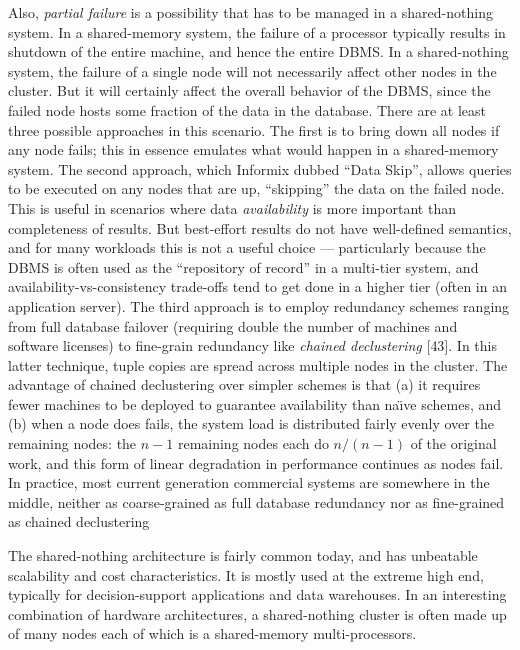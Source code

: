 \documentclass[a4paper,11pt,twoside,openright]{book}
\begin{document}
Also, \emph{partial failure} is a possibility that has to be managed in
a shared-nothing system. In a shared-memory system, the failure of a
processor typically results in shutdown of the entire machine, and hence
the entire DBMS. In a shared-nothing system, the failure of a single
node will not necessarily affect other nodes in the cluster. But it will
certainly affect the overall behavior of the DBMS, since the failed node
hosts some fraction of the data in the database. There are at least
three possible approaches in this scenario. The first is to bring down
all nodes if any node fails; this in essence emulates what would happen
in a shared-memory system. The second approach, which Informix dubbed
``Data Skip'', allows queries to be executed on any nodes that are up,
``skipping'' the data on the failed node. This is useful in scenarios
where data \emph{availability} is more important than completeness of
results. But best-effort results do not have well-defined semantics, and
for many workloads this is not a useful choice --- particularly because
the DBMS is often used as the ``repository of record'' in a multi-tier
system, and availability-vs-consistency trade-offs tend to get done in a
higher tier (often in an application server). The third approach is to
employ redundancy schemes ranging from full database failover (requiring
double the number of machines and software licenses) to fine-grain
redundancy like \emph{chained declustering} {[}43{]}. In this latter
technique, tuple copies are spread across multiple nodes in the cluster.
The advantage of chained declustering over simpler schemes is that (a)
it requires fewer machines to be deployed to guarantee availability than
na{\"\i}ve schemes, and (b) when a node does fails, the system load is
distributed fairly evenly over the remaining nodes: the $n - 1$
remaining nodes each do $n / (n - 1)$ of the
original work, and this form of linear degradation in performance
continues as nodes fail. In practice, most current generation commercial
systems are somewhere in the middle, neither as coarse-grained as full
database redundancy nor as fine-grained as chained declustering

The shared-nothing architecture is fairly common today, and has
unbeatable scalability and cost characteristics. It is mostly used at
the extreme high end, typically for decision-support applications and
data warehouses. In an interesting combination of hardware
architectures, a shared-nothing cluster is often made up of many nodes
each of which is a shared-memory multi-processors.
\end{document}
